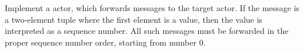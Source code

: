 \documentclass[11pt]{article}
\begin{document}
\begin{myExercise}
Implement a  actor, which forwards messages to the target actor. If the message is a two-element tuple where the first element is a  value, then the  value is interpreted as a sequence number. All such messages must be forwarded in the proper sequence number order, starting from number 0.
\end{myExercise}

\end{document}
